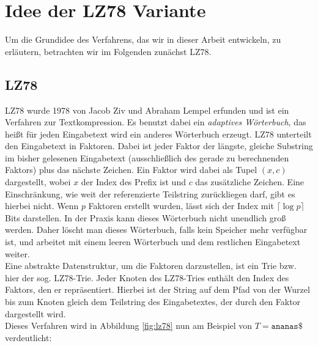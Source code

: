 \documentclass[a4paper,11pt]{scrartcl}%
\theoremstyle{change}
\theoremstyle{nonumberplain}
\theoremstyle{change}
\theoremstyle{nonumberplain}
\theoremstyle{change}
\theoremstyle{nonumberplain}
\begin{document}
	
\section{Idee der LZ78 Variante}

Um die Grundidee des Verfahrens, das wir in dieser Arbeit entwickeln, zu erläutern, betrachten wir im Folgenden zunächst LZ78.

\subsection{LZ78}\label{lz78_sec}

LZ78 wurde 1978 von Jacob Ziv und Abraham Lempel erfunden\cite{lempelziv78} und ist ein Verfahren zur Textkompression. Es benutzt dabei ein \textit{adaptives Wörterbuch}, das heißt für jeden Eingabetext wird ein anderes Wörterbuch erzeugt. LZ78 unterteilt den Eingabetext in Faktoren. Dabei ist jeder Faktor der längste, gleiche Substring im bisher gelesenen Eingabetext (ausschließlich des gerade zu berechnenden Faktors) plus das nächste Zeichen. Ein Faktor wird dabei als Tupel $(x,c)$ dargestellt, wobei $x$ der Index des Prefix ist und $c$ das zusätzliche Zeichen. Eine Einschränkung, wie weit der referenzierte Teilstring zurückliegen darf, gibt es hierbei nicht. Wenn $p$ Faktoren erstellt wurden, lässt sich der Index mit $\lceil\log p\rceil$ Bits darstellen. In der Praxis kann dieses Wörterbuch nicht unendlich groß werden. Daher löscht man dieses Wörterbuch, falls kein Speicher mehr verfügbar ist, und arbeitet mit einem leeren Wörterbuch und dem restlichen Eingabetext weiter.\\
Eine abstrakte Datenstruktur, um die Faktoren darzustellen, ist ein Trie bzw. hier der sog. LZ78-Trie. Jeder Knoten des LZ78-Tries enthält den Index des Faktors, den er repräsentiert. Hierbei ist der String auf dem Pfad von der Wurzel bis zum Knoten gleich dem Teilstring des Eingabetextes, der durch den Faktor dargestellt wird. \cite[S.225]{bellTextCompression}\\
Dieses Verfahren wird in Abbildung \ref{fig:lz78} nun am Beispiel von $T = \texttt{ananas\$}$ verdeutlicht:
\end{document}
